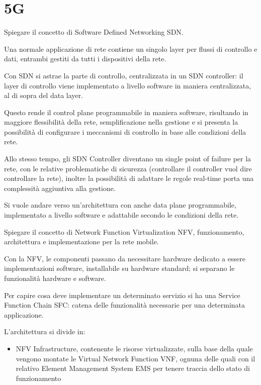 \section{5G}

\begin{questions}
    \question Spiegare il concetto di Software Defined Networking SDN.
    
    \begin{solution}
        Una normale applicazione di rete contiene un singolo layer per flussi di controllo e dati, entrambi gestiti da tutti i dispositivi della rete.
        
        Con SDN si astrae la parte di controllo, centralizzata in un SDN controller: il layer di controllo viene implementato a livello software in maniera centralizzata, al di sopra del data layer.
        
        Questo rende il control plane programmabile in maniera software, risultando in maggiore flessibilità della rete, semplificazione nella gestione e si presenta la possibilità di configurare i meccanismi di controllo in base alle condizioni della rete.
        
        Allo stesso tempo, gli SDN Controller diventano un single point of failure per la rete, con le relative problematiche di sicurezza (controllare il controller vuol dire controllare la rete), inoltre la possibilità di adattare le regole real-time porta una complessità aggiuntiva alla gestione.
        
        Si vuole andare verso un'architettura con anche data plane programmabile, implementato a livello software e adattabile secondo le condizioni della rete.
    \end{solution}
    
    \question Spiegare il concetto di Network Function Virtualization NFV, funzionamento, architettura e implementazione per la rete mobile.
    
    \begin{solution}
        Con la NFV, le componenti passano da necessitare hardware dedicato a essere implementazioni software, installabile su hardware standard; si separano le funzionalità hardware e software.
        
        Per capire cosa deve implementare un determinato servizio si ha una Service Function Chain SFC: catena delle funzionalità necessarie per una determinata applicazione.
        
        L'architettura si divide in: 
        \begin{itemize}
            \item NFV Infrastructure, contenente le risorse virtualizzate, sulla base della quale vengono montate le Virtual Network Function VNF, ognuna delle quali con il relativo Element Management System EMS per tenere traccia dello stato di funzionamento
            

\end{itemize}
\end{solution}
\end{questions}
